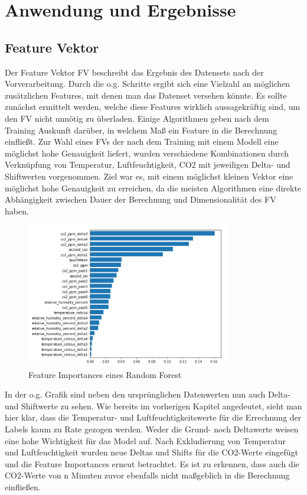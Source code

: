 \clearpage
\chapter{\textbf{Anwendung und Ergebnisse}}\label{kap3}

\section{Feature Vektor}
Der Feature Vektor FV beschreibt das Ergebnis des Datensets nach der Vorverarbeitung. 
Durch die o.g. Schritte ergibt sich eine Vielzahl an möglichen zusätzlichen Features,
mit denen man das Datenset versehen könnte. Es sollte zunächst ermittelt werden, welche diese Features wirklich 
aussagekräftig sind, um den FV nicht unnötig zu überladen. Einige Algorithmen geben nach dem Training 
Auskunft darüber, in welchem Maß ein Feature in die Berechnung einfließt. Zur Wahl eines FVs der 
nach dem Training mit einem Modell eine möglichst hohe Genauigkeit liefert, wurden verschiedene Kombinationen durch 
Verknüpfung von Temperatur, Luftfeuchtigkeit, CO2 mit jeweiligen Delta- und Shiftwerten vorgenommen. Ziel war es, 
mit einem möglichst kleinen Vektor eine möglichst hohe Genauigkeit zu erreichen, da die meisten Algorithmen eine 
direkte Abhängigkeit zwischen Dauer der Berechnung und Dimensionalität des FV haben.  

\begin{figure}[h]
    \centering
    \includegraphics[width=0.8\textwidth]{pic/feature_importances.png}
    \caption{Feature Importances eines Random Forest}
    \label{fig:FI}
\end{figure}

In der o.g. Grafik sind neben den ursprünglichen Datenwerten nun auch Delta- und Shiftwerte zu sehen. Wie bereits 
im vorherigen Kapitel angedeutet, sieht man hier klar, dass die Temperatur- und Luftfeuchtigkeitswerte für 
die Errechnung der Labels kaum zu Rate gezogen werden. Weder die Grund- noch Deltawerte weisen eine hohe 
Wichtigkeit für das Model auf.
\newpage
Nach Exkludierung von Temperatur und Luftfeuchtigkeit wurden neue Deltas und Shifts für die CO2-Werte eingefügt 
und die Feature Importances erneut betrachtet. Es ist zu erkennen, dass auch die CO2-Werte von n Minuten zuvor 
ebenfalls nicht maßgeblich in die Berechnung einfließen.\\

